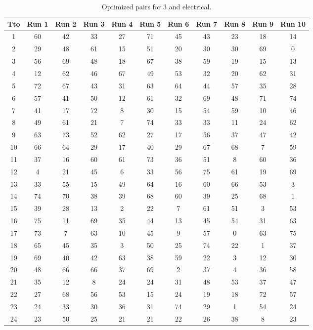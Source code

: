 \begin{table}
  \centering
  \scriptsize
  \caption{Optimized pairs for 3 and electrical.}
  \label{tab_pairs}
\begin{tabular}{c c c c c c c c c c c }
\hline
Tto & Run 1 & Run 2 & Run 3 & Run 4 & Run 5 & Run 6 & Run 7 & Run 8 & Run 9 & Run 10 \\
\hline
1 & 60 & 42 & 33 & 27 & 71 & 45 & 43 & 23 & 18 & 14 \\
2 & 29 & 48 & 61 & 15 & 51 & 20 & 30 & 30 & 69 & 0 \\
3 & 56 & 69 & 48 & 18 & 67 & 38 & 59 & 19 & 15 & 13 \\
4 & 12 & 62 & 46 & 67 & 49 & 53 & 32 & 20 & 62 & 31 \\
5 & 72 & 67 & 43 & 31 & 63 & 64 & 44 & 57 & 35 & 28 \\
6 & 57 & 41 & 50 & 12 & 61 & 32 & 69 & 48 & 71 & 74 \\
7 & 41 & 17 & 72 & 8 & 30 & 15 & 54 & 59 & 10 & 46 \\
8 & 49 & 61 & 21 & 7 & 74 & 33 & 33 & 11 & 24 & 62 \\
9 & 63 & 73 & 52 & 62 & 27 & 17 & 56 & 37 & 47 & 42 \\
10 & 66 & 64 & 29 & 17 & 40 & 29 & 67 & 68 & 7 & 59 \\
11 & 37 & 16 & 60 & 61 & 73 & 36 & 51 & 8 & 60 & 36 \\
12 & 4 & 21 & 45 & 6 & 33 & 56 & 75 & 61 & 19 & 69 \\
13 & 33 & 55 & 15 & 49 & 64 & 16 & 60 & 66 & 53 & 3 \\
14 & 74 & 70 & 38 & 39 & 68 & 60 & 39 & 25 & 68 & 1 \\
15 & 39 & 28 & 13 & 2 & 22 & 7 & 61 & 51 & 3 & 53 \\
16 & 75 & 11 & 69 & 35 & 44 & 13 & 45 & 54 & 31 & 63 \\
17 & 73 & 7 & 63 & 10 & 45 & 9 & 57 & 0 & 63 & 75 \\
18 & 65 & 45 & 35 & 3 & 50 & 25 & 74 & 22 & 1 & 37 \\
19 & 69 & 40 & 42 & 63 & 38 & 59 & 22 & 3 & 12 & 30 \\
20 & 48 & 66 & 66 & 37 & 69 & 2 & 37 & 4 & 36 & 58 \\
21 & 35 & 12 & 8 & 24 & 24 & 31 & 48 & 53 & 37 & 47 \\
22 & 27 & 68 & 56 & 53 & 15 & 24 & 19 & 18 & 72 & 57 \\
23 & 24 & 33 & 30 & 36 & 31 & 74 & 29 & 1 & 54 & 24 \\
24 & 23 & 50 & 25 & 21 & 21 & 22 & 26 & 38 & 8 & 23 \\

\end{tabular}
\end{table}
